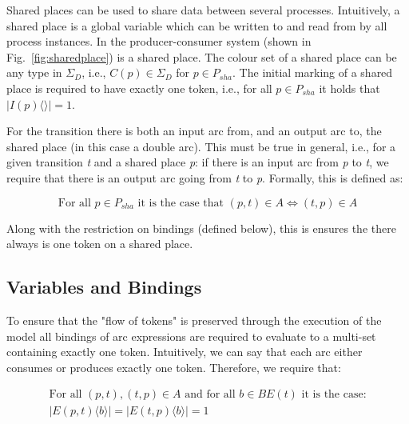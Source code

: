 Shared places can be used to share data between several processes. Intuitively, a shared place is a global variable which can be written to and read from by all process instances. In the producer-consumer system  (shown in Fig.~\ref{fig:sharedplace}) is a shared place. The colour set of a shared place can be any type in $\Sigma_{D}$, i.e., $C(p) \in \Sigma_{D}$ for $p \in P_{sha}$. The initial marking of a shared place is required to have exactly one token, i.e., for all $p \in P_{sha}$ it holds that $\mid I(p)\langle \rangle \mid = 1$.

For the transition  there is both an input arc from, and an output arc to, the shared place  (in this case a double arc). This must be true in general, i.e., for a given transition \emph{t} and a shared place \emph{p}: if there is an input arc from \emph{p} to \emph{t}, we require that there is an output arc going from \emph{t} to \emph{p}. Formally, this is defined as:

\begin{displaymath}
\text{For all } p \in P_{sha} \text{ it is the case that } (p, t) \in A \Leftrightarrow (t, p) \in A
\end{displaymath}

\noindent
Along with the restriction on bindings (defined below), this is ensures the there always is one token on a shared place.


\subsection{Variables and Bindings}
To ensure that the "flow of tokens" is preserved through the execution of the model all bindings of arc expressions are required to evaluate to a multi-set containing exactly one token. Intuitively, we can say that each arc either consumes or produces exactly one token. Therefore, we require that:

\begin{displaymath}
\begin{array}{l}
\text{For all } (p, t), (t, p) \in A \text{ and for all } b \in BE(t) \text{ it is the case:} \\
\mid E(p, t)\langle b \rangle \mid = \mid E(t, p)\langle b \rangle \mid = 1
\end{array}
\end{displaymath}


